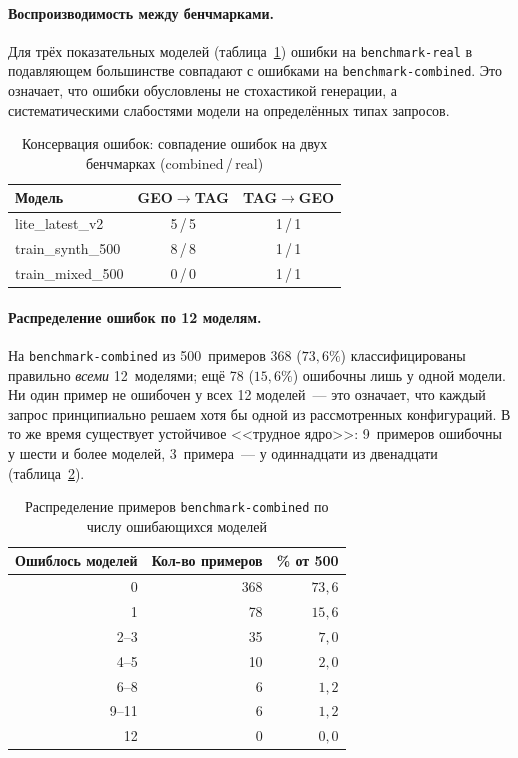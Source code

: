 \paragraph{Воспроизводимость между бенчмарками.} Для трёх показательных моделей (таблица~\ref{tab:error_conservation}) ошибки на \texttt{benchmark-real} в подавляющем большинстве совпадают с ошибками на \texttt{benchmark-combined}. Это означает, что ошибки обусловлены не стохастикой генерации, а систематическими слабостями модели на определённых типах запросов.

\begin{table}[H]
\centering
\caption{Консервация ошибок: совпадение ошибок на двух бенчмарках (combined\,/\,real)}
\label{tab:error_conservation}
\def\arraystretch{1.15}
\begin{tabular}{l c c}
    \toprule
    \textbf{Модель} & \textbf{GEO$\to$TAG} & \textbf{TAG$\to$GEO} \\
    \midrule
    lite\_latest\_v2   & 5\,/\,5 & 1\,/\,1 \\
    train\_synth\_500  & 8\,/\,8 & 1\,/\,1 \\
    train\_mixed\_500  & 0\,/\,0 & 1\,/\,1 \\
    \bottomrule
\end{tabular}
\end{table}

\paragraph{Распределение ошибок по 12 моделям.} На \texttt{benchmark-combined} из 500~примеров 368 ($73{,}6\%$) классифицированы правильно \emph{всеми} 12~моделями; ещё 78 ($15{,}6\%$) ошибочны лишь у одной модели. Ни один пример не ошибочен у всех 12 моделей~--- это означает, что каждый запрос принципиально решаем хотя бы одной из рассмотренных конфигураций. В то же время существует устойчивое <<трудное ядро>>: 9~примеров ошибочны у шести и более моделей, 3~примера~--- у одиннадцати из двенадцати (таблица~\ref{tab:error_distribution}).

\begin{table}[H]
\centering
\caption{Распределение примеров \texttt{benchmark-combined} по числу ошибающихся моделей}
\label{tab:error_distribution}
\def\arraystretch{1.15}
\setlength\tabcolsep{0.6em}
\begin{tabular}{r r r}
    \toprule
    \textbf{Ошиблось моделей} & \textbf{Кол-во примеров} & \textbf{\% от 500} \\
    \midrule
    0     & 368 & $73{,}6$ \\
    1     &  78 & $15{,}6$ \\
    2--3  &  35 & $7{,}0$ \\
    4--5  &  10 & $2{,}0$ \\
    6--8  &   6 & $1{,}2$ \\
    9--11 &   6 & $1{,}2$ \\
    12    &   0 & $0{,}0$ \\
    \bottomrule
\end{tabular}
\end{table}


